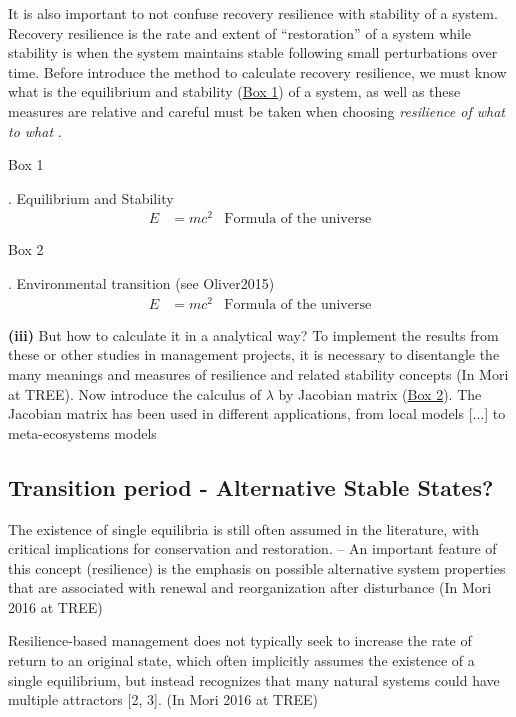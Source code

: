 It is also important to not confuse recovery resilience with stability of a system.
Recovery resilience is the rate and extent of ``restoration'' of a system while stability is when the system maintains stable following small perturbations over time.
Before introduce the method to calculate recovery resilience, we must know what is the equilibrium and stability (\hyperlink{box1}{Box 1}) of a system, as well as these measures are relative and careful must be taken when choosing \textit{resilience of what to what} \parencite{Carpenter2001}.

\begin{tcolorbox}
\hypertarget{box1}{Box 1}. Equilibrium and Stability
\begin{align}
E &= mc^2 & \text{Formula of the universe}
\end{align}
\end{tcolorbox}

\begin{tcolorbox}
\hypertarget{box2}{Box 2}. Environmental transition (see Oliver2015)
\begin{align}
E &= mc^2 & \text{Formula of the universe}
\end{align}
\end{tcolorbox}

\textbf{(iii)} But how to calculate it in a analytical way?
To implement the results from these or other studies in management projects, it is necessary to disentangle the many meanings and measures of resilience and related stability concepts (In Mori at TREE).
Now introduce the calculus of $\lambda$ by Jacobian matrix (\hyperlink{box2}{Box 2}).
The Jacobian matrix has been used in different applications, from local models [...] to meta-ecosystems models \parencite{Gravel2016}

\subsection{Transition period - Alternative Stable States?}
The existence of single equilibria is still often assumed in the literature, with critical implications for conservation and restoration. -- An important feature of this concept (resilience) is the emphasis on possible alternative system properties that are associated with renewal and reorganization after disturbance (In Mori 2016 at TREE)

Resilience-based management does not typically seek to increase the rate of return to an original state, which often implicitly assumes the existence of a single equilibrium, but instead recognizes that many natural systems could have multiple attractors [2, 3]. (In Mori 2016 at TREE)

